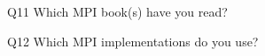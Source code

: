 \begin{description}%
\item{Q11} Which MPI book(s) have you read?%
\item{Q12} Which MPI implementations do you use?%
\end{description}%
